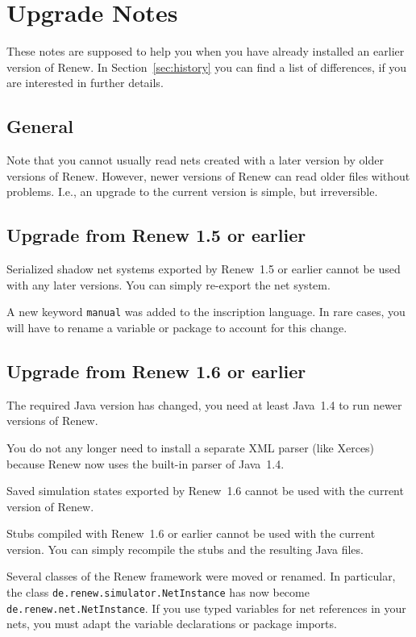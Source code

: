 \section{Upgrade Notes}\label{sec:upgrade}

These notes are supposed to help you when you have already
installed an earlier version of Renew. In Section~\ref{sec:history}
you can find a list of differences, if you are interested in
further details.

\subsection{General}

Note that you cannot usually read nets created with a later
version by older versions of Renew. However, newer versions of
Renew can read older files without problems.
I.e., an upgrade to the current
version is simple, but irreversible. 


\subsection{Upgrade from Renew 1.5 or earlier}

Serialized shadow net systems exported by Renew~1.5 or earlier
cannot be used with any later versions. You can simply re-export
the net system.

A new keyword \texttt{manual} was added to the inscription
language. In rare cases, you will have to rename a variable
or package to account for this change.

\subsection{Upgrade from Renew 1.6 or earlier}

The required Java version has changed, you need at least
Java~1.4 to run newer versions of Renew.

You do not any longer need to install a separate XML parser (like
Xerces) because Renew now uses the built-in parser of Java~1.4.

Saved simulation states exported by Renew~1.6 cannot be used with 
the current version of Renew.

Stubs compiled with Renew~1.6 or earlier cannot be used with 
the current version. You can simply recompile the stubs and the
resulting Java files.

Several classes of the Renew framework were moved or renamed.
In particular, the class \texttt{de.renew.simulator.NetInstance} has now
become \texttt{de.renew.net.NetInstance}. If you use typed
variables for net references in your nets, you must adapt
the variable declarations or package imports.


